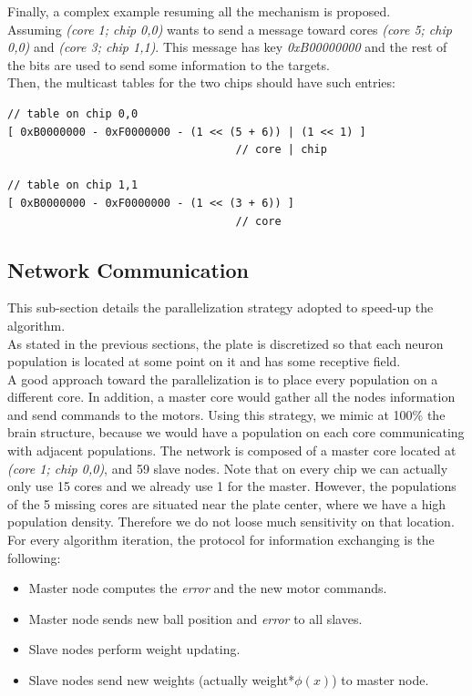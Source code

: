 \documentclass{article}
\begin{document}
Finally, a complex example resuming all the mechanism is proposed.\\
Assuming \textit{(core 1; chip 0,0)} wants to send a message toward cores \textit{(core 5; chip 0,0)} and \textit{(core 3; chip 1,1)}. This message has key \textit{0xB00000000} and the rest of the bits are used to send some information to the targets.\\
Then, the multicast tables for the two chips should have such entries:
\begin{verbatim}
// table on chip 0,0
[ 0xB0000000 - 0xF0000000 - (1 << (5 + 6)) | (1 << 1) ]
                                   // core | chip
								
// table on chip 1,1
[ 0xB0000000 - 0xF0000000 - (1 << (3 + 6)) ]
                                   // core
\end{verbatim}


\subsection{Network Communication}
This sub-section details the parallelization strategy adopted to speed-up the algorithm. \\

As stated in the previous sections, the plate is discretized so that each neuron population is located at some point on it and has some receptive field.\\
A good approach toward the parallelization is to place every population on a different core. In addition, a master core would gather all the nodes information and send commands to the motors. Using this strategy, we mimic at 100\% the brain structure, because we would have a population on each core communicating with adjacent populations. The network is composed of a master core located at \textit{(core 1; chip 0,0)}, and 59 slave nodes. Note that on every chip we can actually only use 15 cores and we already use 1 for the master. However, the populations of the 5 missing cores are situated near the plate center, where we have a high population density. Therefore we do not loose much sensitivity on that location.\\
For every algorithm iteration, the protocol for information exchanging  is the following:

\begin{itemize}
\item Master node computes the \textit{error} and the new motor commands.
\item Master node sends new ball position and \textit{error} to all slaves.
\item Slave nodes perform weight updating.
\item Slave nodes send new weights (actually weight*\(\phi(x)\)) to master node.
\end{itemize}
\end{document}
